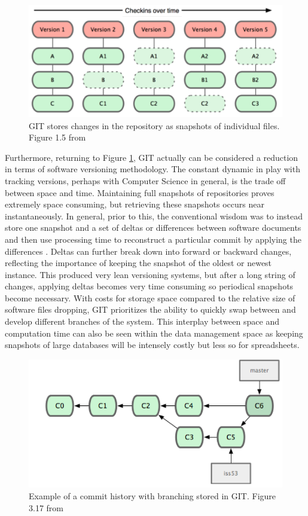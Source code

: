 \begin{figure}
	\centering
	\includegraphics[scale=0.50]{figures/GITFiles.png}
	\caption{GIT stores changes in the repository as snapshots of individual files. Figure 1.5 from \cite{Chacon:2009:PG:1618548}}
	\label{GITFile}
\end{figure}

Furthermore, returning to Figure \ref{GITFile}, GIT actually can be considered a reduction in terms of software versioning methodology.
The constant dynamic in play with tracking versions, perhaps with Computer Science in general, is the trade off between space and time.
Maintaining full snapshots of repositories proves extremely space consuming, but retrieving these snapshots occurs near instantaneously.
In general, prior to this, the conventional wisdom was to instead store one snapshot and a set of deltas or differences between software documents and then use processing time to reconstruct a particular commit by applying the differences \cite{tichy1985rcs}.
Deltas can further break down into forward or backward changes, reflecting the importance of keeping the snapshot of the oldest or newest instance.
This produced very lean versioning systems, but after a long string of changes, applying deltas becomes very time consuming so periodical snapshots become necessary.
With costs for storage space compared to the relative size of software files dropping, GIT prioritizes the ability to quickly swap between and develop different branches of the system.
This interplay between space and computation time can also be seen within the data management space as keeping snapshots of large databases will be intensely costly but less so for spreadsheets.

\begin{figure}
	\centering
	\includegraphics[scale=0.75]{figures/GITCommitTree.png}
	\caption{Example of a commit history with branching stored in GIT.  Figure 3.17 from \cite{Chacon:2009:PG:1618548}}
	\label{GITTree}
\end{figure}

